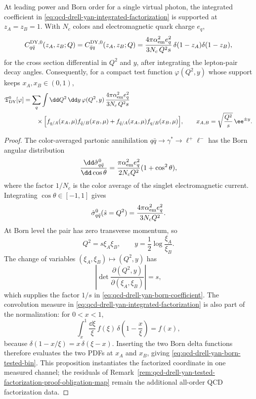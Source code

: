 \begin{proposition}
\label{prop:qcd-drell-yan-born-rapidity-bin}
At leading power and Born order for a single virtual photon, the integrated
coefficient in
\eqref{eq:qcd-drell-yan-integrated-factorization} is supported at
\(z_A=z_B=1\).  With \(N_c\) colors and electromagnetic quark charge \(e_q\),
\begin{equation}
  C_{q\bar q}^{\rm DY,0}(z_A,z_B;Q)
  =
  C_{\bar q q}^{\rm DY,0}(z_A,z_B;Q)
  =
  \frac{4\pi\alpha_{\rm em}^2e_q^2}
       {3N_c\,Q^2s}\,
  \delta(1-z_A)\delta(1-z_B),
  \label{eq:qcd-drell-yan-born-coefficient}
\end{equation}
for the cross section differential in \(Q^2\) and \(y\), after integrating the
lepton-pair decay angles.  Consequently, for a compact test function
\(\varphi(Q^2,y)\) whose support keeps \(x_A,x_B\in(0,1)\),
\begin{equation}
\begin{aligned}
  \mathfrak T_{\rm DY}^{0}[\varphi]
  &=
  \sum_q
  \int\dd Q^2\,\dd y\,
  \varphi(Q^2,y)\,
  \frac{4\pi\alpha_{\rm em}^2e_q^2}
       {3N_c\,Q^2s}                                     \\
  &\qquad{}\times
  \Bigl[
    f_{q/A}(x_A,\mu)f_{\bar q/B}(x_B,\mu)
    +
    f_{\bar q/A}(x_A,\mu)f_{q/B}(x_B,\mu)
  \Bigr],
  \qquad
  x_{A,B}=\sqrt{\frac{Q^2}{s}}\,\ee^{\pm y}.
\end{aligned}
  \label{eq:qcd-drell-yan-born-tested-bin}
\end{equation}
\end{proposition}

\begin{proof}
The color-averaged partonic annihilation
\(q\bar q\to\gamma^\ast\to\ell^+\ell^-\) has the Born angular distribution
\[
  \frac{\dd\hat\sigma_{q\bar q}^{0}}{\dd\cos\theta}
  =
  \frac{\pi\alpha_{\rm em}^2e_q^2}{2N_cQ^2}
  (1+\cos^2\theta),
\]
where the factor \(1/N_c\) is the color average of the singlet electromagnetic
current.  Integrating \(\cos\theta\in[-1,1]\) gives
\[
  \hat\sigma_{q\bar q}^{0}(\hat s=Q^2)
  =
  \frac{4\pi\alpha_{\rm em}^2e_q^2}{3N_cQ^2}.
\]
At Born level the pair has zero transverse momentum, so
\[
  Q^2=s\xi_A\xi_B,
  \qquad
  y=\frac12\log\frac{\xi_A}{\xi_B}.
\]
The change of variables \((\xi_A,\xi_B)\mapsto(Q^2,y)\) has
\[
  \left|
  \det\frac{\partial(Q^2,y)}{\partial(\xi_A,\xi_B)}
  \right|=s,
\]
which supplies the factor \(1/s\) in
\eqref{eq:qcd-drell-yan-born-coefficient}.  The convolution measure in
\eqref{eq:qcd-drell-yan-integrated-factorization} is also part of the
normalization: for \(0<x<1\),
\[
  \int_x^1\frac{\dd\xi}{\xi}\,
  f(\xi)\,\delta\!\left(1-\frac{x}{\xi}\right)
  =
  f(x),
\]
because
\(\delta(1-x/\xi)=x\,\delta(\xi-x)\).  Inserting the two Born delta functions
therefore evaluates the two PDFs at \(x_A\) and \(x_B\), giving
\eqref{eq:qcd-drell-yan-born-tested-bin}.  This proposition instantiates the
factorized coordinate in one measured channel; the residuals of
Remark~\ref{rem:qcd-drell-yan-tested-factorization-proof-obligation-map}
remain the additional all-order QCD factorization data.
\end{proof}

